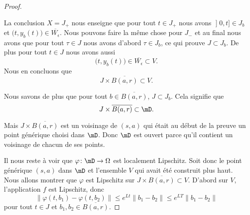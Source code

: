 \begin{proof}
\begin{subproof}
	\end{subproof}

	La conclusion \( X=J_+\) nous enseigne que pour tout \( t\in J_+\) nous avons \( \mathopen] 0 , t \mathclose]\in J_b\) et \( \big( t,y_b(t) \big)\in \overline{ W_{\epsilon} }\). Nous pouvons faire la même chose pour \( J_-\) et au final nous avons que pour tout \( \tau\in J\) nous avons d'abord \( \tau\in J_b\), ce qui prouve \( J\subset J_b\). De plus pour tout \( t\in J\) nous avons aussi
	\begin{equation}
		\big( t,y_b(t) \big)\in\overline{ W_{\epsilon} }\subset V.
	\end{equation}
	Nous en concluons que
	\begin{equation}
		J\times \overline{ B(a,r) }\subset V.
	\end{equation}

	Nous savons de plus que pour tout \( b\in \overline{ B(a,r) }\), \( J\subset J_b\). Cela signifie que
	\begin{equation}
		J\times \overline{ B(a,r) }\subset \mD.
	\end{equation}

	Mais \( J\times \overline{ B(a,r) }\) est un voisinage de \( (s,a)\) qui était au début de la preuve un point générique choisi dans \( \mD\). Donc \( \mD\) est ouvert parce qu'il contient un voisinage de chacun de ses points.

	Il nous reste à voir que \( \varphi\colon \mD\to \Omega\) est localement Lipschitz. Soit donc le point générique \( (s,a)\) dans \( \mD\) et l'ensemble $V$ qui avait été construit plus haut. Nous allons montrer que \( \varphi\) est Lipschitz sur \( J\times \overline{ B(a,r) }\subset V\). D'abord sur \( V\), l'application \( f\) est Lipschitz, donc
	\begin{equation}
		\| \varphi(t,b_1)-\varphi(t,b_2) \|\leq  e^{Lt}\| b_1-b_2 \|
		\leq  e^{LT}\| b_1-b_2 \|
	\end{equation}
	pour tout \( t\in J\) et \( b_1,b_2\in \overline{ B(a,r) }\).


\end{proof}
